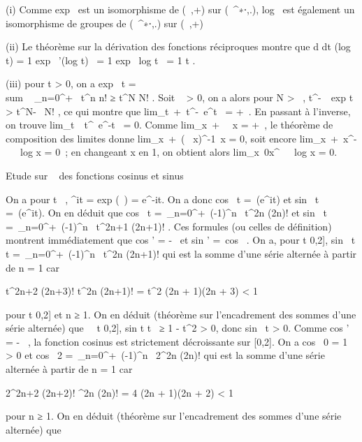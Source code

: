\documentclass[]{article}
\begin{document}
(i) Comme exp~ est un isomorphisme de (~,+) sur
(~^∗⋅,.), log~ est également un
isomorphisme de groupes de (~^∗⋅,.) sur (~,+)

(ii) Le théorème sur la dérivation des fonctions réciproques montre que
 d \over dt (log~ t) = 1
\over exp~
'(log t)~ = 1 \over
exp \ log t~ = 1
\over t .

(iii) pour t \textgreater{} 0, on a exp~ t
= \\sum ~
\_n=0^+\infty~ t^n \over n! ≥
t^N \over N! . Soit \alpha~ \textgreater{} 0, on a
alors pour N \textgreater{} \alpha~, t^-\alpha~\
exp t \textgreater{} t^N-\alpha~ \over N! , ce
qui montre que
lim\_t\rightarrow~+\infty~t^-\alpha~e^t~
= +\infty~. En passant à l'inverse, on trouve
lim\_t\rightarrow~\infty~t^\alpha~e^-t~
= 0. Comme
lim\_x\rightarrow~+\infty~\log~
x = +\infty~, le théorème de composition des limites donne
lim\_x\rightarrow~+\infty~(\log~
x)^-1\diagup\alpha~x = 0, soit encore
lim\_x\rightarrow~+\infty~x^-\alpha~~\
log x = 0~; en changeant x en 1\diagupx, on obtient alors
lim\_x\rightarrow~0x^\alpha~~\
log x = 0.

Etude sur ~ des fonctions cosinus et sinus

On a pour t \in {}~, \overlinee^it
= exp (\overlineit~) =
e^-it. On a donc cos~ t
=\
\mathrmRe(e^it) et
sin~ t =\
\mathrmIm(e^it). On en déduit que
cos~ t =\
\sum  \_n=0^+\infty~(-1)^n~
t^2n \over (2n)! et
sin~ t =\
\sum  \_n=0^+\infty~(-1)^n~
t^2n+1 \over (2n+1)! . Ces formules (ou
celles de définition) montrent immédiatement que
cos ' = -\sin~ et
sin ' =\ cos~ . On a,
pour t \in{]}0,2{]},  sin~ t
\over t =\
\sum  \_n=0^+\infty~(-1)^n~
t^2n \over (2n+1)! qui est la somme d'une
série alternée à partir de n = 1 car

  t^2n+2 \over (2n+3)!
\over  t^2n \over (2n+1)!
 = t^2 \over (2n + 1)(2n + 3)
\textless{} 1

pour t \in{]}0,2{]} et n ≥ 1. On en déduit (théorème sur l'encadrement des
sommes d'une série alternée) que \forall~~t
\in{]}0,2{]}, sin t \over t~ ≥
1 - t^2 \over 6 \textgreater{} 0, donc
sin~ t \textgreater{} 0. Comme
cos ' = -\sin~ , la
fonction cosinus est strictement décroissante sur {[}0,2{]}. On a
cos~ 0 = 1 \textgreater{} 0 et
cos~ 2 =\
\sum  \_n=0^+\infty~(-1)^n~
2^2n \over (2n)! qui est la somme d'une
série alternée à partir de n = 1 car

  2^2n+2 \over (2n+2)!
\over  2^2n \over (2n)! 
= 4 \over (2n + 1)(2n + 2) \textless{} 1

pour n ≥ 1. On en déduit (théorème sur l'encadrement des sommes d'une
série alternée) que
\end{document}
